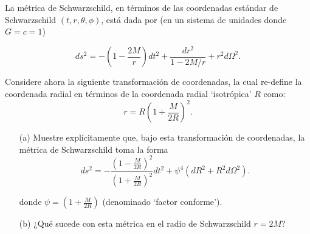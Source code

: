 
\question[2] 
La métrica de Schwarzschild, en términos de las coordenadas estándar de
Schwarzschild $(t,r,\theta,\phi)$, está dada por (en un sistema de unidades donde $G=c=1$)

\begin{equation}
ds^2 = -\left(1-\frac{2M}{r}\right) dt^2 + \frac{dr^2}{1-2M/r} + r^2 d\Omega^2.
  \label{eq:schw-metric}
\end{equation}

Considere ahora la siguiente transformación de coordenadas, la cual re-define la
coordenada radial en términos de la coordenada radial `isotrópica' $R$ como:
\[
r = R\left(1+\frac{M}{2R}\right)^2.
\]

\begin{itemize}
\item[(a)] 
  Muestre explícitamente que, bajo esta transformación de coordenadas, la
  métrica de Schwarzschild toma la forma
\[
ds^2 = -\frac{\left(1-\frac{M}{2R}\right)^2}{\left(1+\frac{M}{2R}\right)^2}dt^2 + \psi^4\left(dR^2 + R^2 d\Omega^2\right).
\]

donde $\psi = \left(1+\frac{M}{2R}\right)$ (denominado `factor conforme').

\item[(b)] ¿Qué sucede con esta métrica en el radio de Schwarzschild $r=2M$?
\end{itemize}



\droptotalpoints
